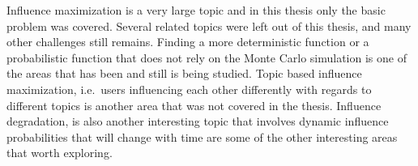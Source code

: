 \documentclass[english]{tktltiki}
\begin{document}
Influence maximization is a very large topic and in this thesis only the basic problem was covered. Several related topics were left out of this thesis, and many other challenges still remains. Finding a more deterministic function or a probabilistic function that does not rely on the Monte Carlo simulation is one of the areas that has been and still is being studied. Topic based influence maximization, i.e.\ users influencing each other differently with regards to different topics is another area that was not covered in the thesis. Influence degradation, is also another interesting topic that involves dynamic influence probabilities that will change with time are some of the other interesting areas that worth exploring.

\pagebreak





\lastpage

\appendices

\pagestyle{empty}
\end{document}
